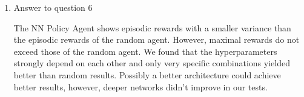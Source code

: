 \documentclass[11pt,a4paper]{article}
\begin{document}
\begin{enumerate}
\item Answer to question 6

The NN Policy Agent shows episodic rewards with a smaller variance than the episodic rewards of the random agent. However, maximal rewards do not exceed those of the random agent. We found that the hyperparameters strongly depend on each other and only very specific combinations yielded better than random results. Possibly a better architecture could achieve better results, however, deeper networks didn't improve in our tests.
\end{enumerate}
\end{document}
